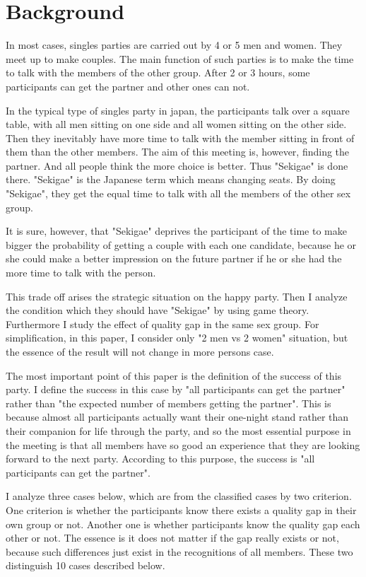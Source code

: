 \documentclass{article}
\begin{document}
\section{Background}
\par
In most cases, singles parties are carried out by 4 or 5 men and women. They meet up to make couples. The main function of such parties is to make the time to talk with the members of the other group. After 2 or 3 hours, some participants can get the partner and other ones can not. 
\par
In the typical type of singles party in japan, the participants talk over a square table, with all men sitting on one side and all women sitting on the other side. Then they inevitably have more time to talk with the member sitting in front of them than the other members. The aim of this meeting is, however, finding the partner. And all people think the more choice is better. Thus "Sekigae" is done there. "Sekigae" is the Japanese term which means changing seats. By doing "Sekigae", they get the equal time to talk with all the members of the other sex group.
\par
It is sure, however, that "Sekigae" deprives the participant of the time to make bigger the probability of getting a couple with each one candidate, because he or she could make a better impression on the future partner if he or she had the more time to talk with the person.
\par
This trade off arises the strategic situation on the happy party. Then I analyze the condition which they should have "Sekigae" by using game theory. Furthermore I study the effect of quality gap in the same sex group. For simplification, in this paper, I consider only "2 men vs 2 women" situation, but the essence of the result will not change in more persons case. 
\par
The most important point of this paper is the definition of the success of this party. I define the success in this case by "all participants can get the partner" rather than "the expected number of members getting the partner". This is because almost all participants actually want their one-night stand rather than their companion for life through the party, and so the most essential purpose in the meeting is that all members have so good an experience that they are looking forward to the next party. According to this purpose, the success is "all participants can get the partner".
\par
I analyze three cases below, which are from the classified cases by two criterion. One criterion is whether the participants know there exists a quality gap in their own group or not. Another one is whether participants know the quality gap each other or not. The essence is it does not matter if the gap really exists or not, because such differences just exist in the recognitions of all members. These two distinguish 10 cases described below.
\end{document}
